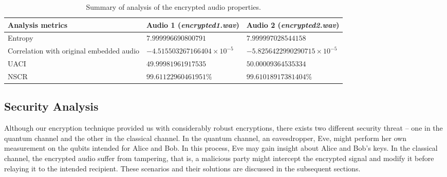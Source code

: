 \documentclass{article}
\begin{document}
\begin{table}[!h]
    \begin{center}
        \caption{Summary of analysis of the encrypted audio properties.}
        \begin{tabularx}{\textwidth}{>{\centering\arraybackslash}X>{\centering\arraybackslash}X>{\centering\arraybackslash}X}
            \hline
            Analysis metrics                         & Audio 1 (\textit{encrypted1.wav}) & Audio 2 (\textit{encrypted2.wav})  \\ \hline
            Entropy                                  & $7.999996690800791$               & $7.999997028544158$                \\
            Correlation with original embedded audio & $-4.515503267166404\times10^{-5}$ & $-5.8256422990290715\times10^{-5}$ \\
            UACI                                     & $49.99981961917535$               & $50.00009364535334$                \\
            NSCR                                     & $99.61122960461951\%$             & $99.61018917381404\%$              \\ \hline
        \end{tabularx}
        \label{table:analysis}
    \end{center}
\end{table}
\subsection{Security Analysis}
Although our encryption technique provided us with considerably robust encryptions, there exists two different security threat -- one in the quantum channel and the other in the classical channel. In the quantum channel, an eavesdropper, Eve, might perform her own measurement on the qubits intended for Alice and Bob. In this process, Eve may gain insight about Alice and Bob's keys. In the classical channel, the encrypted audio suffer from tampering, that is, a malicious party might intercept the encrypted signal and modify it before relaying it to the intended recipient. These scenarios and their solutions are discussed in the subsequent sections.
\end{document}
